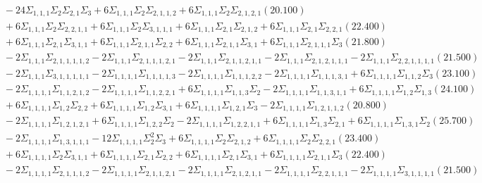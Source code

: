 \documentclass[12pt]{article}
\begin{document}
\begin{landscape}
\begin{align*}
		&\quad\quad -24\Sigma_{1,1,1}\Sigma_{2}\Sigma_{2,1}\Sigma_{3}+6\Sigma_{1,1,1}\Sigma_{2}\Sigma_{2,1,1,2}+6\Sigma_{1,1,1}\Sigma_{2}\Sigma_{2,1,2,1}(20.100) \\ 
		&\quad\quad +6\Sigma_{1,1,1}\Sigma_{2}\Sigma_{2,2,1,1}+6\Sigma_{1,1,1}\Sigma_{2}\Sigma_{3,1,1,1}+6\Sigma_{1,1,1}\Sigma_{2,1}\Sigma_{2,1,2}+6\Sigma_{1,1,1}\Sigma_{2,1}\Sigma_{2,2,1}(22.400) \\ 
		&\quad\quad +6\Sigma_{1,1,1}\Sigma_{2,1}\Sigma_{3,1,1}+6\Sigma_{1,1,1}\Sigma_{2,1,1}\Sigma_{2,2}+6\Sigma_{1,1,1}\Sigma_{2,1,1}\Sigma_{3,1}+6\Sigma_{1,1,1}\Sigma_{2,1,1,1}\Sigma_{3}(21.800) \\ 
		&\quad\quad -2\Sigma_{1,1,1}\Sigma_{2,1,1,1,1,2}-2\Sigma_{1,1,1}\Sigma_{2,1,1,1,2,1}-2\Sigma_{1,1,1}\Sigma_{2,1,1,2,1,1}-2\Sigma_{1,1,1}\Sigma_{2,1,2,1,1,1}-2\Sigma_{1,1,1}\Sigma_{2,2,1,1,1,1}(21.500) \\ 
		&\quad\quad -2\Sigma_{1,1,1}\Sigma_{3,1,1,1,1,1}-2\Sigma_{1,1,1,1}\Sigma_{1,1,1,1,3}-2\Sigma_{1,1,1,1}\Sigma_{1,1,1,2,2}-2\Sigma_{1,1,1,1}\Sigma_{1,1,1,3,1}+6\Sigma_{1,1,1,1}\Sigma_{1,1,2}\Sigma_{3}(23.100) \\ 
		&\quad\quad -2\Sigma_{1,1,1,1}\Sigma_{1,1,2,1,2}-2\Sigma_{1,1,1,1}\Sigma_{1,1,2,2,1}+6\Sigma_{1,1,1,1}\Sigma_{1,1,3}\Sigma_{2}-2\Sigma_{1,1,1,1}\Sigma_{1,1,3,1,1}+6\Sigma_{1,1,1,1}\Sigma_{1,2}\Sigma_{1,3}(24.100) \\ 
		&\quad\quad +6\Sigma_{1,1,1,1}\Sigma_{1,2}\Sigma_{2,2}+6\Sigma_{1,1,1,1}\Sigma_{1,2}\Sigma_{3,1}+6\Sigma_{1,1,1,1}\Sigma_{1,2,1}\Sigma_{3}-2\Sigma_{1,1,1,1}\Sigma_{1,2,1,1,2}(20.800) \\ 
		&\quad\quad -2\Sigma_{1,1,1,1}\Sigma_{1,2,1,2,1}+6\Sigma_{1,1,1,1}\Sigma_{1,2,2}\Sigma_{2}-2\Sigma_{1,1,1,1}\Sigma_{1,2,2,1,1}+6\Sigma_{1,1,1,1}\Sigma_{1,3}\Sigma_{2,1}+6\Sigma_{1,1,1,1}\Sigma_{1,3,1}\Sigma_{2}(25.700) \\ 
		&\quad\quad -2\Sigma_{1,1,1,1}\Sigma_{1,3,1,1,1}-12\Sigma_{1,1,1,1}\Sigma_{2}^{2}\Sigma_{3}+6\Sigma_{1,1,1,1}\Sigma_{2}\Sigma_{2,1,2}+6\Sigma_{1,1,1,1}\Sigma_{2}\Sigma_{2,2,1}(23.400) \\ 
		&\quad\quad +6\Sigma_{1,1,1,1}\Sigma_{2}\Sigma_{3,1,1}+6\Sigma_{1,1,1,1}\Sigma_{2,1}\Sigma_{2,2}+6\Sigma_{1,1,1,1}\Sigma_{2,1}\Sigma_{3,1}+6\Sigma_{1,1,1,1}\Sigma_{2,1,1}\Sigma_{3}(22.400) \\ 
		&\quad\quad -2\Sigma_{1,1,1,1}\Sigma_{2,1,1,1,2}-2\Sigma_{1,1,1,1}\Sigma_{2,1,1,2,1}-2\Sigma_{1,1,1,1}\Sigma_{2,1,2,1,1}-2\Sigma_{1,1,1,1}\Sigma_{2,2,1,1,1}-2\Sigma_{1,1,1,1}\Sigma_{3,1,1,1,1}(21.500) \\ 

\end{align*}
\end{landscape}
\end{document}
